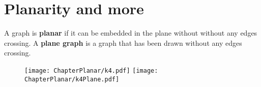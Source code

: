 \chapter{Planarity and more}
A graph is \textbf{planar} if it can be embedded in the plane without without any edges crossing.\newline
A \textbf{plane graph} is a graph that has been drawn without any edges crossing.\newline
\begin{figure}
	\texttt{[image: ChapterPlanar/k4.pdf]}
	\texttt{[image: ChapterPlanar/k4Plane.pdf]}
\end{figure}
